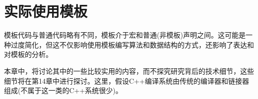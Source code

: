 \chapter{实际使用模板}
模板代码与普通代码略有不同，模板介于宏和普通(非模板)声明之间。这可能是一种过度简化，但这不仅影响使用模板编写算法和数据结构的方式，还影响了表达和对模板的分析。

本章中，将讨论其中的一些比较实用的内容，而不探究研究背后的技术细节，这些细节将在第14章中进行探讨。这里，假设C++编译系统由传统的编译器和链接器组成(不属于这一类的C++系统很少)。





